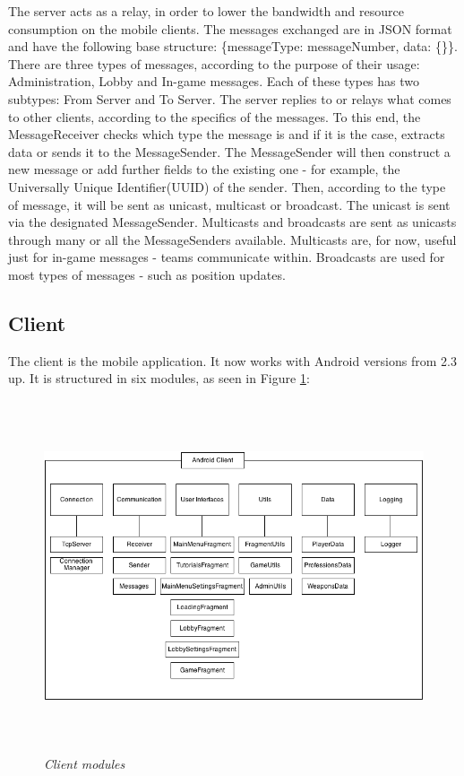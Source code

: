 The server acts as a relay, in order to lower the bandwidth and
resource consumption on the mobile clients. The messages exchanged are in
JSON format and have the following base structure: \{messageType: messageNumber,
data: \{\}\}. There are three types of messages, according to the purpose of
their usage: Administration, Lobby and In-game messages. Each of these types has
two subtypes: From Server and To Server. The server replies to or relays what
comes to other clients, according to the specifics of the messages. To this
end, the MessageReceiver checks which type the message is and if it is the case, extracts
data or sends it to the MessageSender. The MessageSender will then construct a
new message or add further fields to the existing one - for example, the
Universally Unique Identifier(UUID) of the sender. Then, according to the type
of message, it will be sent as unicast, multicast or broadcast. The unicast is
sent via the designated MessageSender. Multicasts and broadcasts are sent as
unicasts through many or all the MessageSenders available. Multicasts are, for
now, useful just for in-game messages - teams communicate within. Broadcasts are
used for most types of messages - such as position updates.\newline

\subsection{Client}

The client is the mobile application. It now works with Android versions from
2.3 up. It is structured in six modules, as seen in Figure \ref{fig:clientModules}:

\begin{figure}
\includegraphics[height=4.08in,width=6.23in]{./images/diagrams/client_modules.png}  
\caption{\small \sl Client modules \label{fig:clientModules}}
\end{figure}

